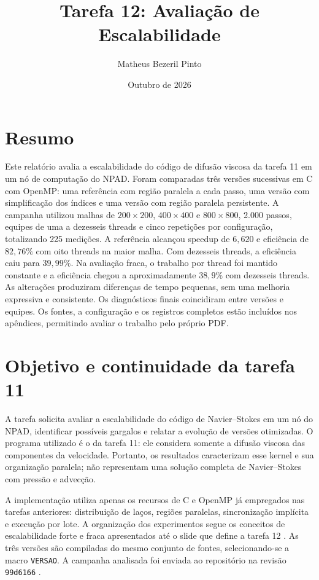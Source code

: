 \documentclass[12pt,a4paper]{article}
\title{\textbf{Tarefa 12: Avaliação de Escalabilidade}}
\author{Matheus Bezeril Pinto}
\date{Outubro de 2026}
\begin{document}
\maketitle

\section*{Resumo}
Este relatório avalia a escalabilidade do código de difusão viscosa da tarefa 11 em um nó de computação do NPAD. Foram comparadas três versões sucessivas em C com OpenMP: uma referência com região paralela a cada passo, uma versão com simplificação dos índices e uma versão com região paralela persistente. A campanha utilizou malhas de $200\times200$, $400\times400$ e $800\times800$, 2.000 passos, equipes de uma a dezesseis threads e cinco repetições por configuração, totalizando 225 medições. A referência alcançou speedup de $6{,}620$ e eficiência de $82{,}76\%$ com oito threads na maior malha. Com dezesseis threads, a eficiência caiu para $39{,}99\%$. Na avaliação fraca, o trabalho por thread foi mantido constante e a eficiência chegou a aproximadamente $38{,}9\%$ com dezesseis threads. As alterações produziram diferenças de tempo pequenas, sem uma melhoria expressiva e consistente. Os diagnósticos finais coincidiram entre versões e equipes. Os fontes, a configuração e os registros completos estão incluídos nos apêndices, permitindo avaliar o trabalho pelo próprio PDF.

\section{Objetivo e continuidade da tarefa 11}
A tarefa solicita avaliar a escalabilidade do código de Navier--Stokes em um nó do NPAD, identificar possíveis gargalos e relatar a evolução de versões otimizadas. O programa utilizado é o da tarefa 11: ele considera somente a difusão viscosa das componentes da velocidade. Portanto, os resultados caracterizam esse kernel e sua organização paralela; não representam uma solução completa de Navier--Stokes com pressão e advecção.

A implementação utiliza apenas os recursos de C e OpenMP já empregados nas tarefas anteriores: distribuição de laços, regiões paralelas, sincronização implícita e execução por lote. A organização dos experimentos segue os conceitos de escalabilidade forte e fraca apresentados até o slide que define a tarefa 12 \cite{slides}. As três versões são compiladas do mesmo conjunto de fontes, selecionando-se a macro \texttt{VERSAO}. A campanha analisada foi enviada ao repositório na revisão \texttt{99d6166} \cite{repositorio}.
\end{document}
